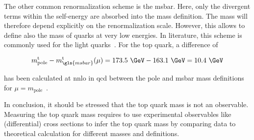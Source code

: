 The other common renormalization scheme is the \gls{msbar}. Here, only the divergent terms within the self-energy are absorbed into the mass definition. The mass will therefore depend explicitly on the renormalization scale. However, this allows to define also the mass of quarks at very low energies. In literature, this scheme is commonly used for the light quarks~\cite{Olive:2016xmw}. For the top quark, a difference of

\begin{equation}
m_\mathrm{pole}^\mathrm{t}-m_{\gls{msbar}}^\mathrm{t}(\mu)=173.5~\GeV-163.1~\GeV=10.4~\GeV
\end{equation}

has been calculated at \gls{nnlo} in \gls{qcd} between the pole and \gls{msbar} mass definitions for $\mu=m_\mathrm{pole}$~\cite{Jegerlehner:2012kn}.

In conclusion, it should be stressed that the top quark mass is not an observable. Measuring the top quark mass requires to use experimental observables like (differential) cross sections to infer the top quark mass by comparing data to theoretical calculation for different masses and definitions. 

